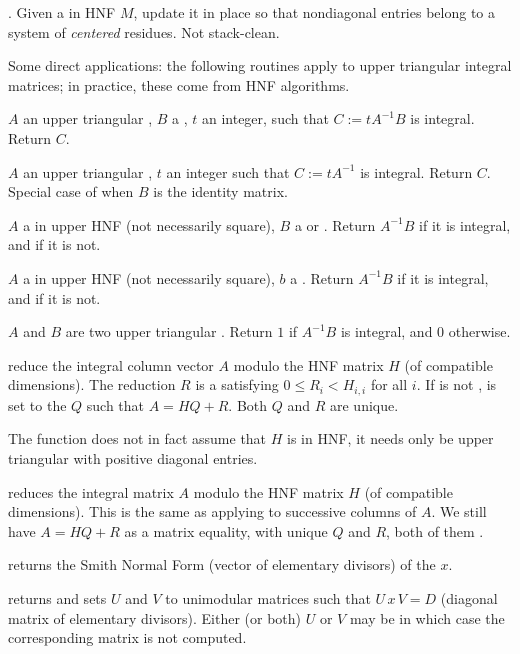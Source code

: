 . Given a  in HNF $M$, update it in
place so that nondiagonal entries belong to a system of \emph{centered}
residues. Not stack-clean.

Some direct applications: the following routines apply to upper triangular
integral matrices; in practice, these come from HNF algorithms.

 $A$ an upper triangular ,
$B$ a , $t$ an integer, such that $C := tA^{-1}B$ is integral.
Return $C$.

 $A$ an upper triangular ,
$t$ an integer such that $C := tA^{-1}$ is integral. Return $C$. Special case
of  when $B$ is the identity matrix.

 $A$ a  in upper HNF (not
necessarily square), $B$ a  or . Return $A^{-1}B$ if it is
integral, and  if it is not.

 $A$ a  in upper HNF
(not necessarily square), $b$ a .  Return $A^{-1}B$ if it is
integral, and  if it is not.

 $A$ and $B$ are two upper triangular
. Return $1$ if $A^{-1} B$ is integral, and $0$ otherwise.

 reduce the integral column vector
$A$ modulo the HNF matrix $H$ (of compatible dimensions). The reduction
$R$ is a  satisfying $0\leq R_i < H_{i,i}$ for all $i$. If 
is not ,  is set to the  $Q$ such that
$A = HQ + R$. Both $Q$ and $R$ are unique.

The function does not in fact assume that $H$ is in HNF, it needs only be
upper triangular with positive diagonal entries.

 reduces the integral matrix $A$
modulo the HNF matrix $H$ (of compatible dimensions). This is
the same as applying  to successive columns of $A$.
We still have $A = HQ + R$ as a matrix equality, with unique $Q$ and $R$,
both of them .


 returns the Smith Normal Form (vector of
elementary divisors) of the  $x$.

 returns
 and sets $U$ and $V$ to unimodular matrices such that $U\,
x\, V = D$ (diagonal matrix of elementary divisors). Either (or both) $U$ or
$V$ may be  in which case the corresponding matrix is not computed.

